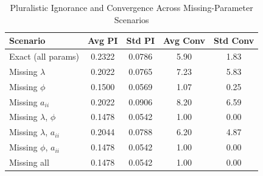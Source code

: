 
\begin{table}[H]
\centering
\caption{Pluralistic Ignorance and Convergence Across Missing-Parameter Scenarios}
\label{tab:missing_params}
\begin{tabular}{lcccc}
\hline
\textbf{Scenario} & \textbf{Avg PI} & \textbf{Std PI} & \textbf{Avg Conv} & \textbf{Std Conv} \\
\hline
Exact (all params) & 0.2322 & 0.0786 & 5.90 & 1.83 \\
Missing $\lambda$ & 0.2022 & 0.0765 & 7.23 & 5.83 \\
Missing $\phi$ & 0.1500 & 0.0569 & 1.07 & 0.25 \\
Missing $a_{ii}$ & 0.2022 & 0.0906 & 8.20 & 6.59 \\
Missing $\lambda$, $\phi$ & 0.1478 & 0.0542 & 1.00 & 0.00 \\
Missing $\lambda$, $a_{ii}$ & 0.2044 & 0.0788 & 6.20 & 4.87 \\
Missing $\phi$, $a_{ii}$ & 0.1478 & 0.0542 & 1.00 & 0.00 \\
Missing all & 0.1478 & 0.0542 & 1.00 & 0.00 \\
\hline
\end{tabular}
\end{table}
